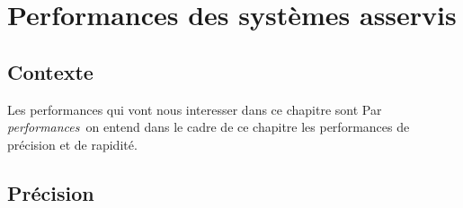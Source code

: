 \chapter{Performances des systèmes asservis\label{chap-perf}}

\minitoc
\newpage

\section{Contexte}

Les performances qui vont nous interesser dans 
ce chapitre sont  
Par \emph{performances} on entend dans le cadre de ce chapitre
les performances de précision et de rapidité.

\section{Précision}

